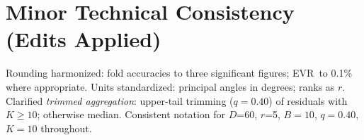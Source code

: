 \documentclass[11pt]{article}
\newcommand{\D}{\ensuremath{D}\xspace}
\newcommand{\rankr}{\ensuremath{r}\xspace}
\newcommand{\EVR}{EVR\xspace}
\begin{document}
\section*{Minor Technical Consistency (Edits Applied)}
Rounding harmonized: fold accuracies to three significant figures; \EVR\ to 0.1\% where appropriate. Units standardized: principal angles in degrees; ranks as \rankr. Clarified \emph{trimmed aggregation}: upper-tail trimming ($q=0.40$) of residuals with $K\ge 10$; otherwise median. Consistent notation for \D=60, \rankr=5, $B=10$, $q=0.40$, $K=10$ throughout.
\end{document}
